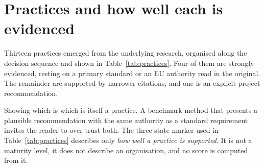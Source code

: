 \documentclass[10pt,twocolumn,a4paper]{article}
\begin{document}
\section{Practices and how well each is evidenced}
\label{sec:practices}

Thirteen practices emerged from the underlying research, organised along the
decision sequence and shown in Table~\ref{tab:practices}. Four of them are
strongly evidenced, resting on a primary standard or an EU authority read in the
original. The remainder are supported by narrower citations, and one is an
explicit project recommendation.

Showing which is which is itself a practice. A benchmark method that presents a
plausible recommendation with the same authority as a standard requirement
invites the reader to over-trust both. The three-state marker used in
Table~\ref{tab:practices} describes only \emph{how well a practice is supported}.
It is not a maturity level, it does not describe an organisation, and no score is
computed from it.
\end{document}
